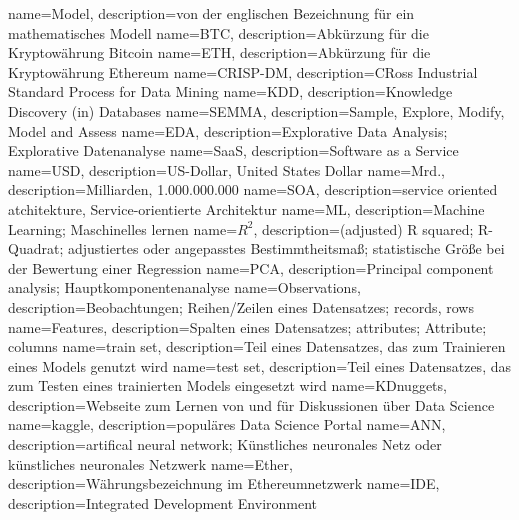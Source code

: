 {
    name=Model,
    description={von der englischen Bezeichnung für ein mathematisches Modell}
}
{
    name=BTC,
    description={Abkürzung für die Kryptowährung Bitcoin}
}
{
    name=ETH,
    description={Abkürzung für die Kryptowährung Ethereum}
}
{
    name=CRISP-DM,
    description={CRoss Industrial Standard Process for Data Mining}
}
{
    name=KDD,
    description={Knowledge Discovery (in) Databases }
}
{
    name=SEMMA,
    description={Sample, Explore, Modify, Model and Assess}
}
{
    name=EDA,
    description={Explorative Data Analysis; Explorative Datenanalyse}
}
{
    name=SaaS,
    description={Software as a Service}
}
{
    name=USD,
    description={US-Dollar, United States Dollar}
}
{
    name=Mrd.,
    description={Milliarden, 1.000.000.000}
}
{
    name=SOA,
    description={service oriented atchitekture, Service-orientierte Architektur}
}
{
    name=ML,
    description={Machine Learning; Maschinelles lernen}
}
{
    name=$ R^2 $,
    description={(adjusted) R squared; R-Quadrat; adjustiertes oder angepasstes Bestimmtheitsmaß; statistische Größe bei der Bewertung einer Regression}
}
{
    name=PCA,
    description={Principal component analysis; Hauptkomponentenanalyse}
}
{
    name=Observations,
    description={Beobachtungen; Reihen/Zeilen eines Datensatzes; records, rows}
}
{
    name=Features,
    description={Spalten eines Datensatzes; attributes; Attribute; columns}
}
{
    name=train set,
    description={Teil eines Datensatzes, das zum Trainieren eines Models genutzt wird}
}
{
    name=test set,
    description={Teil eines Datensatzes, das zum Testen eines trainierten Models eingesetzt wird}
}
{
    name=KDnuggets,
    description={Webseite zum Lernen von und für Diskussionen über Data Science}
}
{
    name=kaggle,
    description={populäres Data Science Portal}
}
{
    name=ANN,
    description={artifical neural network; Künstliches neuronales Netz oder künstliches neuronales Netzwerk}
}
{
    name=Ether,
    description={Währungsbezeichnung im Ethereumnetzwerk}
}
{
    name=IDE,
    description={Integrated Development Environment}
}
